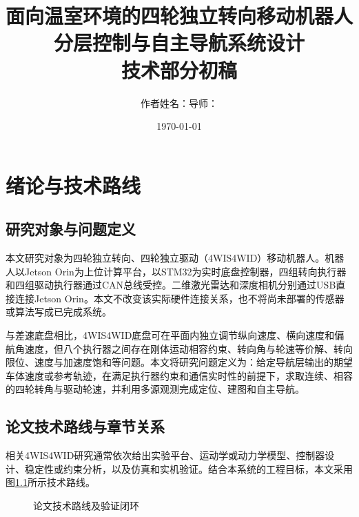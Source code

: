 \documentclass[UTF8,openany,12pt,a4paper]{ctexrep}
\title{面向温室环境的四轮独立转向移动机器人\\分层控制与自主导航系统设计\\[1em]\large 技术部分初稿}
\author{作者姓名：\placeholder{填写姓名}\qquad 导师：\placeholder{填写导师}}
\date{\today}
\begin{document}
\maketitle
{}
\tableofcontents
\clearpage
{}

\chapter{绪论与技术路线}
\section{研究对象与问题定义}
本文研究对象为四轮独立转向、四轮独立驱动（4WIS4WID）移动机器人。机器人以Jetson Orin为上位计算平台，以STM32为实时底盘控制器，四组转向执行器和四组驱动执行器通过CAN总线受控。二维激光雷达和深度相机分别通过USB直接连接Jetson Orin。本文不改变该实际硬件连接关系，也不将尚未部署的传感器或算法写成已完成系统。

与差速底盘相比，4WIS4WID底盘可在平面内独立调节纵向速度、横向速度和偏航角速度，但八个执行器之间存在刚体运动相容约束、转向角与轮速等价解、转向限位、速度与加速度饱和等问题。本文将研究问题定义为：给定导航层输出的期望车体速度或参考轨迹，在满足执行器约束和通信实时性的前提下，求取连续、相容的四轮转角与驱动轮速，并利用多源观测完成定位、建图和自主导航。

\section{论文技术路线与章节关系}
相关4WIS4WID研究通常依次给出实验平台、运动学或动力学模型、控制器设计、稳定性或约束分析，以及仿真和实机验证\cite{lee2015,petrovic2024,lee2026}。结合本系统的工程目标，本文采用图\ref{fig:route}所示技术路线。

\begin{figure}[H]
\centering
{}
\caption{论文技术路线及验证闭环}\label{fig:route}
\end{figure}
\end{document}
